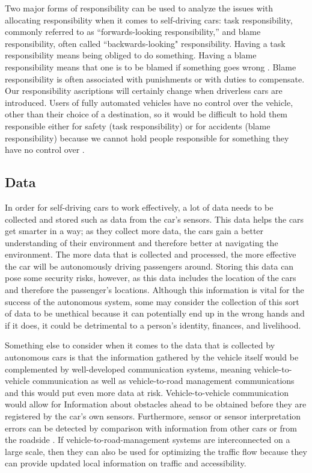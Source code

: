 \documentclass[10pt,twocolumn]{article}
\begin{document}
Two major forms of responsibility can be used to analyze the issues with allocating responsibility when it comes to self-driving cars: task responsibility, commonly referred to as “forwards-looking responsibility,” and blame responsibility, often called “backwards-looking" responsibility. Having a task responsibility means being obliged to do something. Having a blame responsibility means that one is to be blamed if something goes wrong \cite{EthicalOverview}. Blame responsibility is often associated with punishments or with duties to compensate. Our responsibility ascriptions will certainly change when driverless cars are introduced. Users of fully automated vehicles have no control over the vehicle, other than their choice of a destination, so it would be difficult to hold them responsible either for safety (task responsibility) or for accidents (blame responsibility) because we cannot hold people responsible for something they have no control over \cite{EthicalOverview}.

\subsection{Data}
In order for self-driving cars to work effectively, a lot of data needs to be collected and stored such as data from the car’s sensors. This data helps the cars get smarter in a way; as they collect more data, the cars gain a better understanding of their environment and therefore better at navigating the environment. The more data that is collected and processed, the more effective the car will be autonomously driving passengers around. Storing this data can pose some security risks, however, as this data includes the location of the cars and therefore the passenger’s locations. Although this information is vital for the success of the autonomous system, some may consider the collection of this sort of data to be unethical because it can potentially end up in the wrong hands and if it does, it could be detrimental to a person’s identity, finances, and livelihood.

Something else to consider when it comes to the data that is collected by autonomous cars is that the information gathered by the vehicle itself would be complemented by well-developed communication systems, meaning vehicle-to-vehicle communication as well as vehicle-to-road management communications and this would put even more data at risk. Vehicle-to-vehicle communication would allow for Information about obstacles ahead to be obtained before they are registered by the car’s own sensors. Furthermore, sensor or sensor interpretation errors can be detected by comparison with information from other cars or from the roadside \cite{EthicalOverview}. If vehicle-to-road-management systems are interconnected on a large scale, then they can also be used for optimizing the traffic flow because they can provide updated local information on traffic and accessibility.
\end{document}
